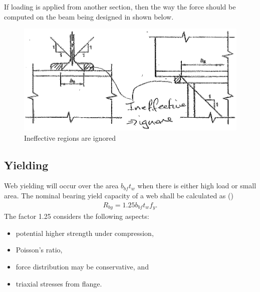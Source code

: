 If loading is applied from another section, then the way the force should be computed on the beam being designed in shown below.
\begin{figure}[H]
\centering\includegraphics{PIC/CH05/BEARO}\caption{Ineffective regions are ignored}
\end{figure}
\subsection{Yielding}
Web yielding will occur over the area $b_{bf}t_w$ when there is either high load or small area. The nominal bearing yield capacity of a web shall be calculated as ()
\begin{gather}
R_{by}=1.25b_{bf}t_wf_y.
\end{gather}
The factor \num{1.25} considers the following aspects:
\begin{itemize}
\item potential higher strength under compression,
\item Poisson's ratio,
\item force distribution may be conservative, and
\item triaxial stresses from flange.
\end{itemize}

